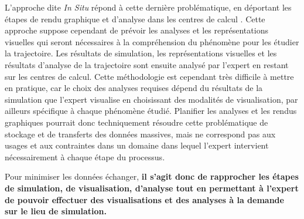 L'approche dite \textit{In Situ} répond à cette dernière problématique, en déportant les étapes de rendu graphique et d'analyse dans les centres de calcul \cite{kuhlen2011parallel,ma2009situ}. Cette approche suppose cependant de prévoir les analyses et les représentations visuelles qui seront nécessaires à la compréhension du phénomène pour les étudier la trajectoire. Les résultats de simulation, les représentations visuelles et les résultats d'analyse de la trajectoire sont ensuite analysé par l'expert en restant sur les centres de calcul. Cette méthodologie est cependant très difficile à mettre en pratique, car le choix des analyses requises dépend du résultats de la simulation que l'expert visualise en choisissant des modalités de visualisation, par ailleurs spécifique à chaque phénomène étudié. Planifier les analyses et les rendus graphiques pourrait donc techniquement résoudre cette problématique de stockage et de transferts des données massives, mais ne correspond pas aux usages et aux contraintes dans un domaine dans lequel l'expert intervient nécessairement à chaque étape du processus.

Pour minimiser les données échanger, \textbf{il s'agit donc de rapprocher les étapes de simulation, de visualisation, d'analyse tout en permettant à l'expert de pouvoir effectuer des visualisations et des analyses à la demande sur le lieu de simulation.}



